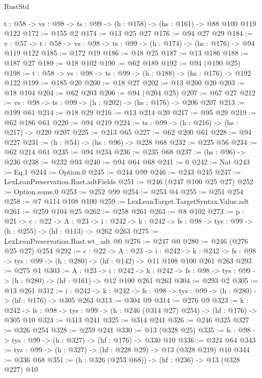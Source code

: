 \begin{lexlean}{RustStd}
\begin{coremodule}
  {t : @58} -> {vs : @98} -> {ts : @99} -> (h : @158) -> (hs : @161) -> @88 @100 @119 @122
@172 := @155 @2
@174 := @13 @25 @27
@176 := @94 @27 @29
@184 := {v : @57} ->
  {t : @58} -> {vs : @98} -> {ts : @99} -> (h : @174) -> (hs : @176) -> @94 @119 @122
@185 := @172 @19
@186 := @18 @25
@187 := @13 @186
@188 := @187 @27
@189 := @18 @102
@190 := @62 @189
@192 := @94 (@190 @25)
@198 := {t : @58} -> {vs : @98} -> {ts : @99} -> (h : @188) -> (hs : @176) -> @192 @122
@199 := @185 @20
@200 := @18 @27
@202 := @13 @200 @20
@203 := @18 @104
@204 := @62 @203
@206 := @94 (@204 @25)
@207 := @67 @27
@212 := {vs : @98} -> {ts : @99} -> (h : @202) -> (hs : @176) -> @206 @207
@213 := @199 @61
@214 := @18 @29
@216 := @13 @214 @20
@217 := @95 @29
@219 := @62 @186 @61
@220 := @94 @219
@224 := {ts : @99} -> (h : @216) -> (hs : @217) -> @220 @207
@225 := @213 @65
@227 := @62 @200 @61
@228 := @94 @227
@231 := (h : @54) -> (hs : @96) -> @228 @68
@232 := @225 @56
@234 := @62 @214 @61
@235 := @94 @234
@236 := @235 @68
@237 := (hs : @96) -> @236
@238 := @232 @93
@240 := @94 @64 @68
@241 := 0
@242 := Nat
@243 := Eq.{1}
@244 := Option.{0}
@245 := @244 @99
@246 := @243 @245
@247 := LexLeanPreservation.Rust.adtFields
@251 := @246 (@247 @100 @25 @27)
@252 := Option.some.{0}
@253 := @252 @99
@254 := @253 @4
@255 := @251 @254
@258 := @7 @114 @108 @100
@259 := LexLeanTarget.TargetSyntax.Value.adt
@261 := @259 @104 @25
@262 := @258 @261
@263 := @8 @102
@273 := {p : @21} ->
  {c : @22} ->
  {A : @23} ->
  {i : @242} -> {k : @242} -> {fs : @98} -> {tys : @99} -> (h : @255) -> (hf : @113) -> @262 @263
@275 := LexLeanPreservation.Rust.wt_adt @0
@276 := @247 @0
@280 := @246 (@276 @25 @27) @254
@292 := {c : @22} ->
  {A : @23} ->
  {i : @242} ->
  {k : @242} -> {fs : @98} -> {tys : @99} -> (h : @280) -> (hf : @142) -> @11 @108 @100 @261 @263
@293 := @275 @1
@303 := {A : @23} ->
  {i : @242} ->
  {k : @242} -> {fs : @98} -> {tys : @99} -> (h : @280) -> (hf : @161) -> @12 @100 @261 @263
@304 := @293 @2
@305 := @13 @261
@312 := {i : @242} ->
  {k : @242} -> {fs : @98} -> {tys : @99} -> (h : @280) -> (hf : @176) -> @305 @263
@313 := @304 @9
@314 := @276 @9
@323 := {k : @242} ->
  {fs : @98} -> {tys : @99} -> (h : @246 (@314 @27) @254) -> (hf : @176) -> @305 @10
@324 := @313 @241
@325 := @314 @241
@326 := @246 @325
@327 := @326 @254
@328 := @259 @241
@330 := @13 (@328 @25)
@335 := {fs : @98} -> {tys : @99} -> (h : @327) -> (hf : @176) -> @330 @10
@336 := @324 @64
@343 := {tys : @99} -> (h : @327) -> (hf : @228 @29) -> @13 (@328 @219) @10
@344 := @336 @68
@351 := (h : @326 (@253 @68)) -> (hf : @236) -> @13 (@328 @227) @10

\end{coremodule}
\end{lexlean}
